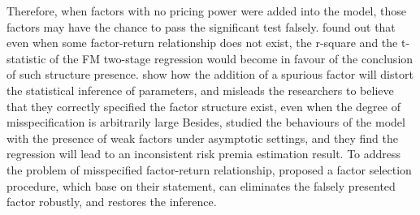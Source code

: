 Therefore, when factors with no pricing power were added into the model, those factors may have the chance to pass the significant test falsely.
 found out that even when some factor-return relationship does not exist, the r-square and the t-statistic of the FM two-stage regression would become in favour of the conclusion of such structure presence. 
 show how the addition of a spurious factor will distort the statistical inference of parameters, and misleads the researchers to believe that they correctly specified the factor structure exist, even when the degree of misspecification is arbitrarily large
Besides,  studied the behaviours of the model with the presence of weak factors under asymptotic settings, and they find the regression will lead to an inconsistent risk premia estimation result.
To address the problem of misspecified factor-return relationship,  proposed a factor selection procedure, which base on their statement, can eliminates the falsely presented factor robustly, and restores the inference. 
	

